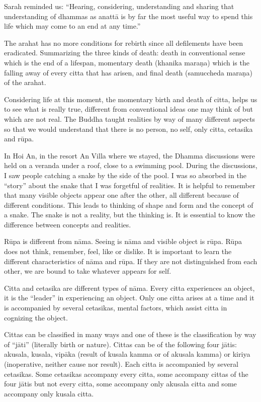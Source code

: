Sarah reminded us: ``Hearing, considering, understanding and sharing
that understanding of dhammas as anattā is by far the most useful way
to spend this life which may come to an end at any time.''

The arahat has no more conditions for rebirth since all defilements have
been eradicated. Summarizing the three kinds of death: death in
conventional sense which is the end of a lifespan, momentary death
(khanika maraṇa) which is the falling away of every citta that has
arisen, and final death (samuccheda maraṇa) of the arahat.

Considering life at this moment, the momentary birth and death of citta,
helps us to see what is really true, different from conventional ideas
one may think of but which are not real. The Buddha taught realities by
way of many different aspects so that we would understand that there is
no person, no self, only citta, cetasika and rūpa.

In Hoi An, in the resort An Villa where we stayed, the Dhamma
discussions were held on a veranda under a roof, close to a swimming
pool. During the discussions, I saw people catching a snake by the side
of the pool. I was so absorbed in the ``story'' about the snake that I
was forgetful of realities. It is helpful to remember that many visible
objects appear one after the other, all different because of different
conditions. This leads to thinking of shape and form and the concept of
a snake. The snake is not a reality, but the thinking is. It is
essential to know the difference between concepts and realities.

Rūpa is different from nāma. Seeing is nāma and visible object is rūpa.
Rūpa does not think, remember, feel, like or dislike. It is important to
learn the different characteristics of nāma and rūpa. If they are not
distinguished from each other, we are bound to take whatever appears for
self.

Citta and cetasika are different types of nāma. Every citta experiences
an object, it is the ``leader'' in experiencing an object. Only one
citta arises at a time and it is accompanied by several cetasikas,
mental factors, which assist citta in cognizing the object.

Cittas can be classified in many ways and one of these is the
classification by way of ``jāti'' (literally birth or nature). Cittas
can be of the following four jātis: akusala, kusala, vipāka (result of
kusala kamma or of akusala kamma) or kiriya (inoperative, neither cause
nor result). Each citta is accompanied by several cetasikas. Some
cetasikas accompany every citta, some accompany cittas of the four jātis
but not every citta, some accompany only akusala citta and some
accompany only kusala citta.


